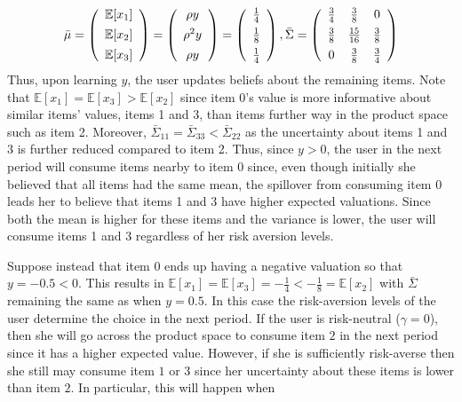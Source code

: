 \documentclass[format=acmsmall, review=false]{acmart}
\begin{document}
\[ \bar{\mu} =   \left (\begin{array}{c}
\mathbb{E}[x_1] \vspace{0.15cm} \\
\mathbb{E}[x_2] \vspace{0.15cm} \\
\mathbb{E}[x_3]
\end{array}  \right) =\left (\begin{array}{c}
\rho y  \vspace{0.15cm} \\
\rho^{2} y  \vspace{0.15cm} \\
 \rho y \\
\end{array} \right) =
\left (\begin{array}{c}
\frac{1}{4} \vspace{0.15cm} \\
\frac{1}{8}  \vspace{0.15cm} \\
\frac{1}{4}
\end{array}  \right), \bar{\Sigma} =  \left( \begin{array}{ccc}
\frac{3}{4} & \frac{3}{8} & 0 \vspace{0.15cm} \\
\frac{3}{8} & \frac{15}{16} & \frac{3}{8} \vspace{0.15cm}  \\
0 &\frac{3}{8} & \frac{3}{4}  \\
\end{array} \right)
\]
Thus, upon learning $y$, the user updates beliefs about the remaining items. Note that $\mathbb{E}[x_1] = \mathbb{E}[x_3] > \mathbb{E}[x_2]$ since item 0's value is more informative about similar items' values, items 1 and 3, than items further way in the product space such as item 2. Moreover, $\bar{\Sigma}_{11} = \bar{\Sigma}_{33} < \bar{\Sigma}_{22}$ as the uncertainty about items 1 and 3 is further reduced compared to item 2. Thus, since $y > 0$, the user in the next period will consume items nearby to item 0 since, even though initially she believed that all items had the same mean, the spillover from consuming item 0 leads her to believe that items 1 and 3 have higher expected valuations. Since both the mean is higher for these items and the variance is lower, the user will consume items 1 and 3 regardless of her risk aversion levels.
\par 
Suppose instead that item 0 ends up having a negative valuation so that $y = -0.5 < 0$. This results in $\mathbb{E}[x_1] = \mathbb{E}[x_3] = -\frac{1}{4} <  -\frac{1}{8} = \mathbb{E}[x_2]$ with $\bar{\Sigma}$ remaining the same as when $y = 0.5$. In this case the risk-aversion levels of the user determine the choice in the next period. If the user is risk-neutral ($\gamma = 0$), then she will go across the product space to consume item $2$ in the next period since it has a higher expected value. However, if she is sufficiently risk-averse then she still may consume item $1$ or $3$ since her uncertainty about these items is lower than item $2$. In particular, this will happen when 
\end{document}
